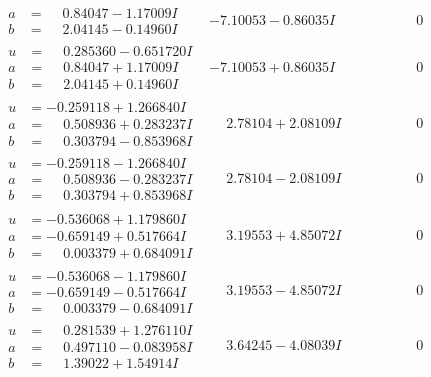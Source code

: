 \documentclass[1p]{elsarticle_modified}
\theoremstyle{definition}
\begin{document}
$$\begin{array}{c|c|c}
\begin{aligned}
a &= \phantom{-}0.84047 - 1.17009 I \\
b &= \phantom{-}2.04145 - 0.14960 I\end{aligned}
 & -7.10053 - 0.86035 I & \phantom{-0.000000 } 0 \\ \hline\begin{aligned}
u &= \phantom{-}0.285360 - 0.651720 I \\
a &= \phantom{-}0.84047 + 1.17009 I \\
b &= \phantom{-}2.04145 + 0.14960 I\end{aligned}
 & -7.10053 + 0.86035 I & \phantom{-0.000000 } 0 \\ \hline\begin{aligned}
u &= -0.259118 + 1.266840 I \\
a &= \phantom{-}0.508936 + 0.283237 I \\
b &= \phantom{-}0.303794 - 0.853968 I\end{aligned}
 & \phantom{-}2.78104 + 2.08109 I & \phantom{-0.000000 } 0 \\ \hline\begin{aligned}
u &= -0.259118 - 1.266840 I \\
a &= \phantom{-}0.508936 - 0.283237 I \\
b &= \phantom{-}0.303794 + 0.853968 I\end{aligned}
 & \phantom{-}2.78104 - 2.08109 I & \phantom{-0.000000 } 0 \\ \hline\begin{aligned}
u &= -0.536068 + 1.179860 I \\
a &= -0.659149 + 0.517664 I \\
b &= \phantom{-}0.003379 + 0.684091 I\end{aligned}
 & \phantom{-}3.19553 + 4.85072 I & \phantom{-0.000000 } 0 \\ \hline\begin{aligned}
u &= -0.536068 - 1.179860 I \\
a &= -0.659149 - 0.517664 I \\
b &= \phantom{-}0.003379 - 0.684091 I\end{aligned}
 & \phantom{-}3.19553 - 4.85072 I & \phantom{-0.000000 } 0 \\ \hline\begin{aligned}
u &= \phantom{-}0.281539 + 1.276110 I \\
a &= \phantom{-}0.497110 - 0.083958 I \\
b &= \phantom{-}1.39022 + 1.54914 I\end{aligned}
 & \phantom{-}3.64245 - 4.08039 I & \phantom{-0.000000 } 0 \\ \hline\begin{aligned}

\end{aligned}
\end{array}$$
\end{document}
